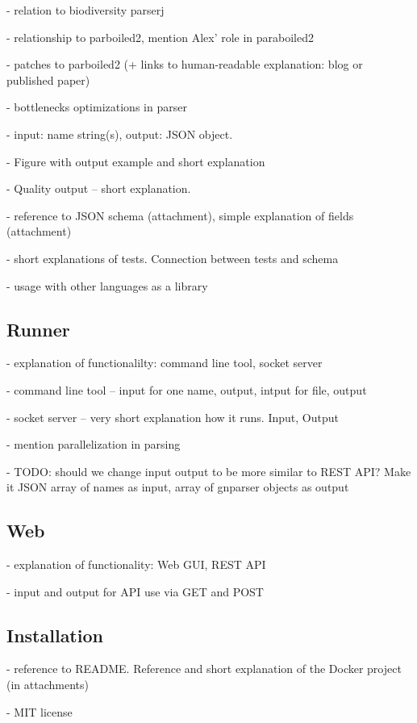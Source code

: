\documentclass{bmcart}
\begin{document}
- relation to biodiversity parserj

- relationship to parboiled2, mention Alex' role in paraboiled2

- patches to parboiled2 (+ links to human-readable explanation: blog or published paper)

- bottlenecks optimizations in parser

- input: name string(s), output: JSON object.

- Figure with output example and short explanation

- Quality output -- short explanation.

- reference to JSON schema (attachment), simple explanation of fields
(attachment)

- short explanations of tests. Connection between tests and schema

- usage with other languages as a library

\subsection*{Runner}

- explanation of functionalilty: command line tool, socket server

- command line tool -- input for one name, output, intput for file, output

- socket server -- very short explanation how it runs. Input, Output

- mention parallelization in parsing

- TODO: should we change input output to be more similar to REST API?
  Make it JSON array of names as input, array of gnparser objects as output

\subsection*{Web}

- explanation of functionality: Web GUI, REST API

- input and output for API use via GET and POST

\subsection*{Installation}

- reference to README. Reference and short explanation of the Docker project
(in attachments)

- MIT license
\end{document}
